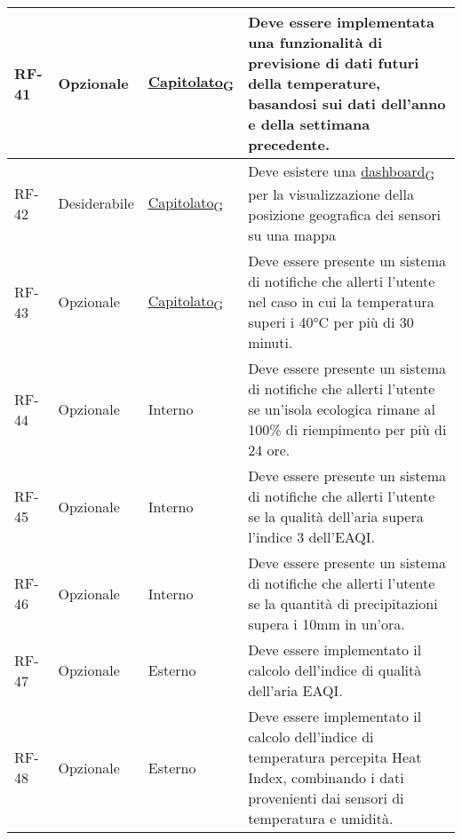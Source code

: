 \begin{longtable}{|>{\centering\arraybackslash}m{}|>{\centering\arraybackslash}m{}|>{\centering\arraybackslash}m{}|>{\centering\arraybackslash}m{}|}
	\\\hline
	RF-41           & Opzionale           & \href{https://7last.github.io/docs/rtb/documentazione-interna/glossario\#capitolato}{Capitolato\textsubscript{G}} & Deve essere implementata una funzionalità di previsione di dati futuri della temperature, basandosi sui dati dell'anno e della settimana precedente.
	\\\hline
	RF-42           & Desiderabile        & \href{https://7last.github.io/docs/rtb/documentazione-interna/glossario\#capitolato}{Capitolato\textsubscript{G}} & Deve esistere una \href{https://7last.github.io/docs/rtb/documentazione-interna/glossario\#dashboard}{dashboard\textsubscript{G}} per la visualizzazione della posizione geografica dei sensori su una mappa
	\\\hline
	RF-43           & Opzionale           & \href{https://7last.github.io/docs/rtb/documentazione-interna/glossario\#capitolato}{Capitolato\textsubscript{G}} & Deve essere presente un sistema di notifiche che allerti l'utente nel caso in cui la temperatura superi i 40°C per più di 30 minuti.
	\\\hline
	RF-44           & Opzionale           & Interno                                                                                                           & Deve essere presente un sistema di notifiche che allerti l'utente se un'isola ecologica rimane al 100\% di riempimento per più di 24 ore.
	\\\hline
	RF-45           & Opzionale           & Interno                                                                                                           & Deve essere presente un sistema di notifiche che allerti l'utente se la qualità dell'aria supera l'indice 3 dell'EAQI.
	\\\hline
	RF-46           & Opzionale           & Interno                                                                                                           & Deve essere presente un sistema di notifiche che allerti l'utente se la quantità di precipitazioni supera i 10mm in un'ora.
	\\\hline
	RF-47           & Opzionale           & Esterno                                                                                                           & Deve essere implementato il calcolo dell'indice di qualità dell'aria EAQI.
	\\\hline
	RF-48           & Opzionale           & Esterno                                                                                                           & Deve essere implementato il calcolo dell'indice di temperatura percepita Heat Index, combinando i dati provenienti dai sensori di temperatura e umidità.

\end{longtable}
